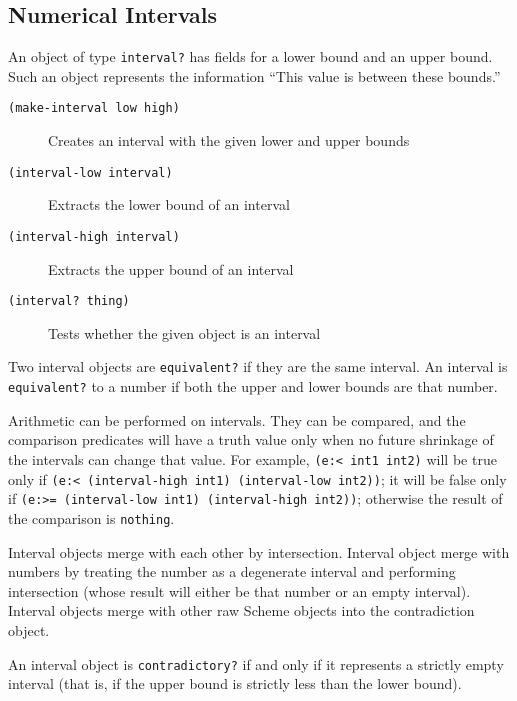 \documentclass[12pt,letterpaper,english]{article}
\begin{document}
\hypertarget{numerical-intervals}{}
\subsection{Numerical Intervals}
\label{numerical-intervals}

An object of type \texttt{interval?} has fields for a lower bound and an
upper bound.  Such an object represents the information ``This value is
between these bounds.''
\begin{description}
\item[{\texttt{(make-interval low high)}}] \leavevmode 
Creates an interval with the given lower and upper bounds

\item[{\texttt{(interval-low interval)}}] \leavevmode 
Extracts the lower bound of an interval

\item[{\texttt{(interval-high interval)}}] \leavevmode 
Extracts the upper bound of an interval

\item[{\texttt{(interval? thing)}}] \leavevmode 
Tests whether the given object is an interval

\end{description}

Two interval objects are \texttt{equivalent?} if they are the same
interval.  An interval is \texttt{equivalent?} to a number if both the
upper and lower bounds are that number.

Arithmetic can be performed on intervals.  They can be compared, and
the comparison predicates will have a truth value only when no future shrinkage
of the intervals can change that value.  For example, \texttt{(e:< int1 int2)} will
be true only if \texttt{(e:< (interval-high int1) (interval-low int2))}; it 
will be false only if \texttt{(e:>= (interval-low int1) (interval-high int2))}; 
otherwise the result of the comparison is \texttt{nothing}.

Interval objects merge with each other by intersection.  Interval
object merge with numbers by treating the number as a degenerate
interval and performing intersection (whose result will either be that
number or an empty interval).  Interval objects merge with other
raw Scheme objects into the contradiction object.

An interval object is \texttt{contradictory?} if and only if it represents
a strictly empty interval (that is, if the upper bound is strictly
less than the lower bound).
\end{document}
